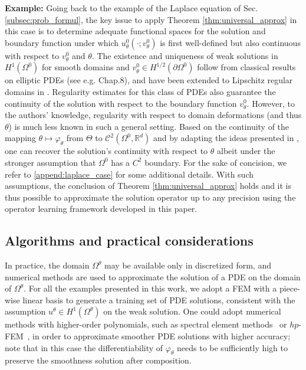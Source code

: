 \documentclass[review]{elsarticle}
\def\Omegatheta{{\Omega^\theta}}
\def\refd{0}
\def\Omegaref{{\Omega^\refd}}
\begin{document}
\begin{mdframed}
\textbf{Example:}
Going back to the example of the Laplace equation of Sec. \ref{subsec:prob_formul}, the key issue to apply Theorem \ref{thm:universal_approx} in this case is to determine adequate functional spaces for the solution and boundary function under which $u^\refd_{\theta}(\cdot;v^\refd_\theta)$ is first well-defined but also continuous with respect to $v^0_\theta$ and $\theta$. The existence and uniqueness of weak solutions in $H^1(\Omegaref)$ for smooth domains and $v^0_\theta \in H^{1/2}(\partial \Omegaref)$ follow from classical results on elliptic PDEs (see e.g. \cite{gilbarg1977elliptic} Chap.8), and have been extended to Lipschitz regular domains in \cite{jerison1995inhomogeneous}. Regularity estimates for this class of PDEs also guarantee the continuity of the solution with respect to the boundary function $v^0_\theta$. However, to the authors' knowledge, regularity with respect to domain deformations (and thus $\theta$) is much less known in such a general setting. 
Based on the continuity of the mapping $\theta \mapsto \varphi_{\theta}$ from $\Theta$ to $\mathcal{C}^2(\Omegaref,\mathbb{R}^d)$ and by adapting the ideas presented in \cite{henry2005perturbation}, one can recover the solution's continuity with respect to $\theta$ albeit under the stronger assumption that $\Omega^0$ has a $C^2$ boundary. For the sake of concision, we refer to \ref{append:laplace_case} for some additional details. With such assumptions, the conclusion of Theorem \ref{thm:universal_approx} holds and it is thus possible to approximate the solution operator up to any precision using the operator learning framework developed in this paper. 
\end{mdframed}


\subsection{Algorithms and practical considerations}
In practice, the domain $\Omegatheta$ may be available only in discretized form, and numerical methods are used to approximate the solution of a PDE on the domain of $\Omegatheta$. For all the examples presented in this work, we adopt a FEM with a piece-wise linear basis to generate a training set of PDE solutions, consistent with the assumption $u^{\theta}\in H^1(\Omegatheta)$ on the weak solution. One could adopt numerical methods with higher-order polynomials, such as spectral element methods~\cite{karniadakis2005spectral,patera1984spectral} or $hp$-FEM~\cite{babuvska1990p}, in order to approximate smoother PDE solutions with higher accuracy; note that in this case the differentiability of $\varphi_{\theta}$ needs to be sufficiently high to preserve the smoothness solution after composition.
\end{document}

